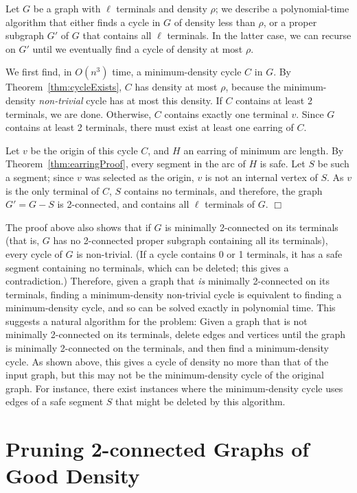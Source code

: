 \documentclass[11pt]{article}
\newenvironment{proofof}[1]{\smallskip\noindent{\bf Proof of #1:}}{\hspace*{\fill}$\Box$\par}
\begin{document}
\begin{proofof}{Theorem~\ref{thm:cycle}}
  Let $G$ be a graph with $\ell$ terminals and density $\rho$; we describe
  a polynomial-time algorithm that either finds a cycle in $G$ of density
  less than $\rho$, or a proper subgraph $G'$ of $G$ that contains all $\ell$
  terminals. In the latter case, we can recurse on $G'$ until we eventually
  find a cycle of density at most $\rho$.

  We first find, in $O(n^3)$ time, a minimum-density cycle $C$ in $G$. By
  Theorem~\ref{thm:cycleExists}, $C$ has density at most $\rho$, because
  the minimum-density \emph{non-trivial} cycle has at most this density.
  If $C$ contains at least 2 terminals, we are done. Otherwise, $C$
  contains exactly one terminal $v$. Since $G$ contains at least 2
  terminals, there must exist at least one earring of $C$.

  Let $v$ be the origin of this cycle $C$, and $H$ an earring of minimum
  arc length. By Theorem~\ref{thm:earringProof}, every segment in the arc
  of $H$ is safe. Let $S$ be such a segment; since $v$ was selected as the
  origin, $v$ is not an internal vertex of $S$. As $v$ is the only terminal
  of $C$, $S$ contains no terminals, and therefore, the graph $G' = G - S$
  is 2-connected, and contains all $\ell$ terminals of $G$.
\end{proofof}

The proof above also shows that if $G$ is minimally 2-connected on its
terminals (that is, $G$ has no 2-connected proper subgraph containing
all its terminals), every cycle of $G$ is non-trivial. (If a cycle
contains 0 or 1 terminals, it has a safe segment containing no
terminals, which can be deleted; this gives a contradiction.)
Therefore, given a graph that \emph{is} minimally 2-connected on its
terminals, finding a minimum-density non-trivial cycle is equivalent
to finding a minimum-density cycle, and so can be solved exactly in
polynomial time.  This suggests a natural algorithm for the problem:
Given a graph that is not minimally 2-connected on its terminals,
delete edges and vertices until the graph is minimally 2-connected on
the terminals, and then find a minimum-density cycle. As shown above,
this gives a cycle of density no more than that of the input graph,
but this may not be the minimum-density cycle of the original
graph. For instance, there exist instances where the minimum-density
cycle uses edges of a safe segment $S$ that might be deleted by this
algorithm.


\section{Pruning 2-connected Graphs of Good Density}
\label{sec:pruning}
\end{document}
